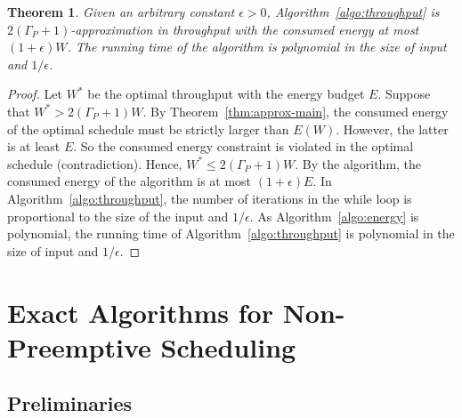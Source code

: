 \documentclass[11pt,a4paper]{article}
\newtheorem{theorem}{Theorem}
\begin{document}
\begin{theorem}
Given an arbitrary constant $\epsilon > 0$, Algorithm~\ref{algo:throughput} is
$2(\Gamma_{P}+1)$-approximation in throughput with the consumed energy at most 
$(1+\epsilon)W$. The running time of the algorithm is 
polynomial in the size of input and $1/\epsilon$. 
\end{theorem}
\begin{proof}
Let $W^{*}$ be the optimal throughput with the energy budget $E$. 
Suppose that $W^{*} > 2(\Gamma_{P}+1)W$. By Theorem~\ref{thm:approx-main},
the consumed energy of the optimal schedule must be strictly larger than $E(W)$. However, the latter is 
at least $E$. So the consumed energy constraint is violated in the optimal schedule
(contradiction). Hence, $W^{*} \leq 2(\Gamma_{P}+1)W$. By the algorithm, the consumed energy
of the algorithm is at most $(1+\epsilon)E$. In Algorithm~\ref{algo:throughput}, 
the number of iterations in the while loop is proportional to the size of the input and $1/\epsilon$.
As Algorithm~\ref{algo:energy} is polynomial, the running time of Algorithm~\ref{algo:throughput}
is polynomial in the size of input and $1/\epsilon$. 
\end{proof}


\section{Exact Algorithms for Non-Pre\-emptive Scheduling}	\label{sec:exact}

\subsection{Preliminaries}
\end{document}
